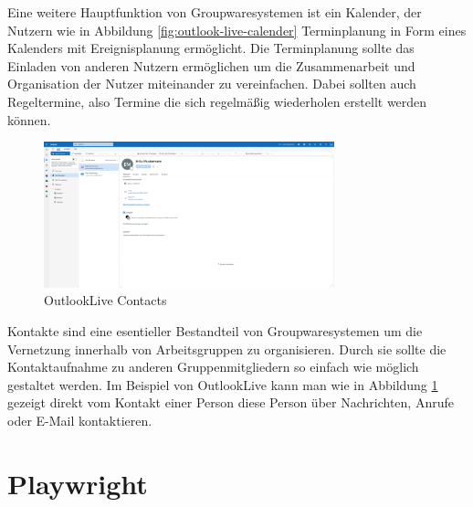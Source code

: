 Eine weitere Hauptfunktion von Groupwaresystemen ist ein Kalender, der Nutzern wie in Abbildung \ref{fig:outlook-live-calender} Terminplanung in Form eines Kalenders mit Ereignisplanung ermöglicht.
Die Terminplanung sollte das Einladen von anderen Nutzern ermöglichen um die Zusammenarbeit und Organisation der Nutzer miteinander zu vereinfachen.
Dabei sollten auch Regeltermine, also Termine die sich regelmäßig wiederholen erstellt werden können.

\begin{figure}[H]
    \centering
    \includegraphics[width=0.75\textwidth]{images/OutlookLive_Contacts.png}
    \caption{OutlookLive Contacts}
    \label{fig:outlook-live-contacts}
\end{figure}

Kontakte sind eine esentieller Bestandteil von Groupwaresystemen um die Vernetzung innerhalb von Arbeitsgruppen zu organisieren.
Durch sie sollte die Kontaktaufnahme zu anderen Gruppenmitgliedern so einfach wie möglich gestaltet werden.
Im Beispiel von OutlookLive kann man wie in Abbildung \ref{fig:outlook-live-contacts} gezeigt direkt vom Kontakt einer Person diese Person über Nachrichten, Anrufe oder E-Mail kontaktieren.


\section{Playwright}

